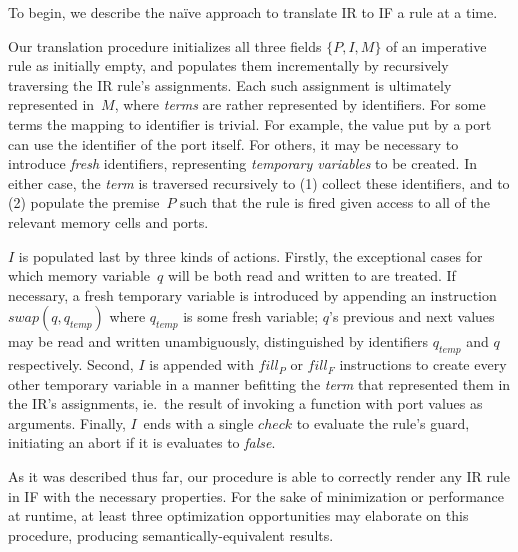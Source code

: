 To begin, we describe the na\"ive approach to translate IR to IF a rule at a time.

Our translation procedure initializes all three fields $\{P, I, M\}$ of an imperative rule as initially empty, and populates them incrementally by recursively traversing the IR rule's assignments. Each such assignment is ultimately represented in~$M$, where \textit{terms} are rather represented by identifiers. For some terms the mapping to identifier is trivial. For example, the value put by a port can use the identifier of the port itself. For others, it may be necessary to introduce \textit{fresh} identifiers, representing \textit{temporary variables} to be created. In either case, the \textit{term} is traversed recursively to (1) collect these identifiers, and to (2) populate the premise~$P$ such that the rule is fired given access to all of the relevant memory cells and ports.

$I$ is populated last by three kinds of actions. Firstly, the exceptional cases for which memory variable~$q$ will be both read and written to are treated. If necessary, a fresh temporary variable is introduced by appending an instruction $swap(q, q_{temp})$ where $q_{temp}$ is some fresh variable; $q$'s previous and next values may be read and written unambiguously, distinguished by identifiers $q_{temp}$ and $q$ respectively. Second, $I$ is appended with $fill_P$ or $fill_F$ instructions to create every other temporary variable in a manner befitting the \textit{term} that represented them in the IR's assignments, ie.\ the result of invoking a function with port values as arguments. Finally, $I$~ends with a single $check$ to evaluate the rule's guard, initiating an abort if it is evaluates to \textit{false}.

As it was described thus far, our procedure is able to correctly render any IR rule in IF with the necessary properties. For the sake of minimization or performance at runtime, at least three optimization opportunities may elaborate on this procedure, producing semantically-equivalent results.

